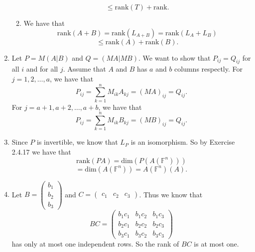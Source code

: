 \begin{enumerate}
\begin{enumerate}
\[\leq\mathrm{rank}(T)+\mathrm{rank}.\]
\item We have that 
\[\mathrm{rank}(A+B)=\mathrm{rank}(L_{A+B})=\mathrm{rank}(L_A+L_B)\]
\[\leq \mathrm{rank}(A)+\mathrm{rank}(B).\]
\end{enumerate}
\item Let $P=M(A|B)$ and $Q=(MA|MB)$. We want to show that $P_{ij}=Q_{ij}$ for all $i$ and for all $j$. Assume that $A$ and $B$ has $a$ and $b$ columns respectly. For $j=1,2,\ldots ,a$, we have that  
\[P_{ij}=\sum_{k=1}^n{M_{ik}A_{kj}}=(MA)_{ij}=Q_{ij}.\]
For $j=a+1,a+2,\ldots ,a+b$, we have that 
\[P_{ij}=\sum_{k=1}^n{M_{ik}B_{kj}}=(MB)_{ij}=Q_{ij}.\]
\item Since $P$ is invertible, we know that $L_P$ is an isomorphism. So by Exercise 2.4.17 we have that 
\[\mathrm{rank}(PA)=\mathrm{dim}(P(A(\mathbb{F}^n)))\]
\[=\mathrm{dim}(A(\mathbb{F}^n))=A(\mathbb{F}^n)(A).\]
\item Let $B=\begin{pmatrix}b_1\\b_2\\b_3\end{pmatrix}$ and $C=\begin{pmatrix}c_1&c_2&c_3\end{pmatrix}$. Thus we know that 
\[BC=\begin{pmatrix}b_1c_1&b_1c_2&b_1c_3\\b_2c_1&b_2c_2&b_2c_3\\b_3c_1&b_3c_2&b_3c_3\end{pmatrix}\]
has only at most one independent rows. So the rank of $BC$ is at most one.


\end{enumerate}
